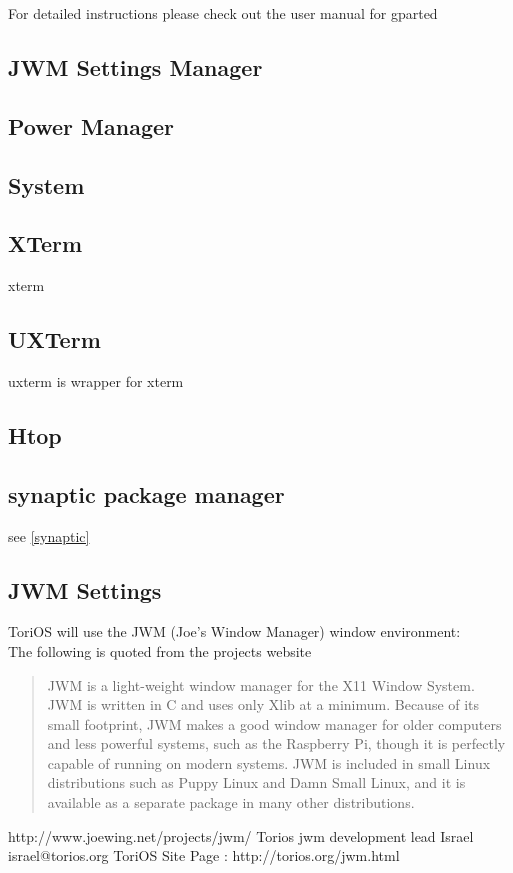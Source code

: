 \documentclass[12pt,a4paper]{book}
\begin{document}
For detailed instructions please check out the user manual for gparted \cite{Gparted}

\newpage
\subsection{JWM Settings Manager}
\subsection{Power Manager}

\subsection{System}

\subsection{XTerm}

xterm \cite{xterm} 

\subsection{UXTerm}


uxterm \cite{uxterm} is wrapper for xterm






\subsection{Htop}
\subsection{synaptic package manager}
see \ref{synaptic}


\subsection{JWM Settings}
ToriOS will use the JWM (Joe's Window Manager) window environment:\\

The following is quoted from the projects website

\begin{quote}
JWM is a light-weight window manager for the X11 Window System. JWM is written in C and uses only Xlib at a minimum. Because of its small footprint, JWM makes a good window manager for older computers and less powerful systems, such as the Raspberry Pi, though it is perfectly capable of running on modern systems. JWM is included in small Linux distributions such as Puppy Linux and Damn Small Linux, and it is available as a separate package in many other distributions. 
\end{quote}
http://www.joewing.net/projects/jwm/
Torios jwm development lead Israel israel@torios.org
ToriOS Site Page : http://torios.org/jwm.html
\newpage
\end{document}
